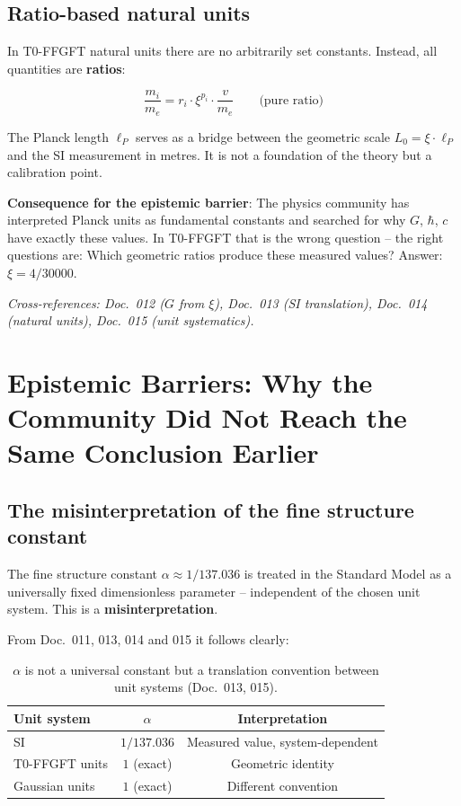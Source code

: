 \subsection{Ratio-based natural units}

In T0-FFGFT natural units there are no arbitrarily set constants.
Instead, all quantities are \textbf{ratios}:

\begin{equation}
    \frac{m_i}{m_e} = r_i \cdot \xi^{p_i} \cdot \frac{v}{m_e}
    \qquad \text{(pure ratio)}
\end{equation}

The Planck length $\ell_P$ serves as a bridge between the geometric
scale $L_0 = \xi \cdot \ell_P$ and the SI measurement in metres.
It is not a foundation of the theory but a calibration point.

\textbf{Consequence for the epistemic barrier}:
The physics community has interpreted Planck units as fundamental
constants and searched for why $G$, $\hbar$, $c$ have exactly these
values. In T0-FFGFT that is the wrong question -- the right questions are:
Which geometric ratios produce these measured values? Answer:
$\xi = 4/30000$.

\noindent\textit{Cross-references: Doc.~012 ($G$ from $\xi$),
Doc.~013 (SI translation), Doc.~014 (natural units),
Doc.~015 (unit systematics).}

\section{Epistemic Barriers: Why the Community Did Not Reach the Same Conclusion Earlier}

\subsection{The misinterpretation of the fine structure constant}

The fine structure constant $\alpha \approx 1/137.036$ is treated in
the Standard Model as a universally fixed dimensionless parameter --
independent of the chosen unit system. This is a \textbf{misinterpretation}.

From Doc.~011, 013, 014 and 015 it follows clearly:

\begin{table}[htbp]
\centering
\begin{tabular}{lcc}
\toprule
\textbf{Unit system} & $\alpha$ & \textbf{Interpretation} \\
\midrule
SI                        & $1/137.036$ & Measured value, system-dependent \\
T0-FFGFT units          & $1$ (exact)  & Geometric identity \\
Gaussian units            & $1$ (exact)  & Different convention \\
\bottomrule
\end{tabular}
\caption{$\alpha$ is not a universal constant but a translation
convention between unit systems (Doc.~013, 015).}
\label{tab:alpha_units}
\end{table}

